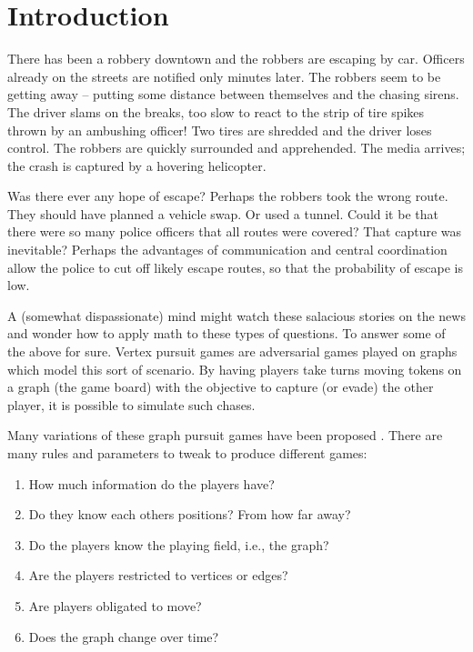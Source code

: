 \chapter{Introduction}\label{chapter intro}

There has been a robbery downtown and the robbers are escaping by car. Officers
already on the streets are notified only minutes later. The robbers seem to be getting away -- putting some distance between themselves and the chasing sirens.
The driver slams on the breaks, too slow to react to the strip of tire spikes thrown by an ambushing officer! Two tires are shredded and the driver loses control. The robbers are quickly surrounded and apprehended. The media arrives; the crash is captured by a hovering helicopter.

Was there ever any hope of escape? Perhaps the robbers took the wrong route.
They should have planned a vehicle swap. Or used a tunnel. Could it be that there were
so many police officers that all routes were covered? That capture was inevitable?
Perhaps the advantages of communication and central coordination allow the police to
  cut off likely escape routes, so that the probability of escape is low.

A (somewhat dispassionate) mind might watch these salacious stories on the news and wonder
 how to apply math to these types of questions. To answer some of the above for sure.
Vertex pursuit games are adversarial games played on graphs which model this sort
of scenario.
By having players take turns moving tokens on a graph (the game board) with
the objective to capture (or evade) the other player, it is possible to simulate such chases.

Many variations of these graph pursuit games have been proposed \cite{bonato2017graph, bellman1967graphs}. There are many rules and parameters to tweak to produce different games:

\begin{enumerate}
\item How much information do the players have?
\item Do they know each others positions? From how far away?
\item Do the players know the playing field, i.e., the graph?
\item Are the players restricted to vertices or edges?
\item Are players obligated to move?
\item Does the graph change over time?
\end{enumerate}

